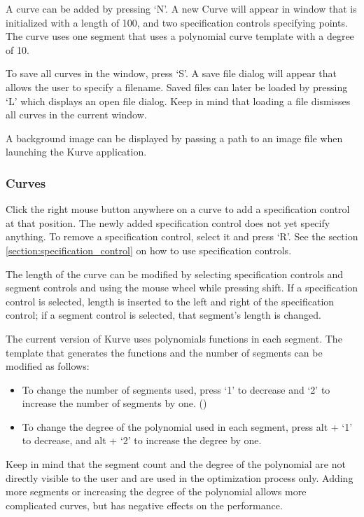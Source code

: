 \documentclass[a4paper]{article}
\begin{document}
					A curve can be added by pressing `N'. A new Curve will appear in window that is initialized with a length of 100, and two specification controls specifying points. The curve uses one segment that uses a polynomial curve template with a degree of 10.
					
					To save all curves in the window, press `S'. A save file dialog will appear that allows the user to specify a filename. Saved files can later be loaded by pressing `L' which displays an open file dialog. Keep in mind that loading a file dismisses all curves in the current window.
					
					A background image can be displayed by passing a path to an image file when launching the Kurve application.
					
				\subsubsection{Curves}
					
					Click the right mouse button anywhere on a curve to add a specification control at that position. The newly added specification control does not yet specify anything. To remove a specification control, select it and press `R'. See the section \ref{section:specification_control} on how to use specification controls. 
					
					The length of the curve can be modified by selecting specification controls and segment controls and using the mouse wheel while pressing shift. If a specification control is selected, length is inserted to the left and right of the specification control; if a segment control is selected, that segment's length is changed.
					
					The current version of Kurve uses polynomials functions in each segment. The template that generates the functions and the number of segments can be modified as follows:
					
					\begin{itemize}
						\item To change the number of segments used, press `1' to decrease and `2' to increase the number of segments by one. ()
						\item To change the degree of the polynomial used in each segment, press alt + `1' to decrease, and alt + `2' to increase the degree by one.
					\end{itemize}
					Keep in mind that the segment count and the degree of the polynomial are not directly visible to the user and are used in the optimization process only. Adding more segments or increasing the degree of the polynomial allows more complicated curves, but has negative effects on the performance.
\end{document}
